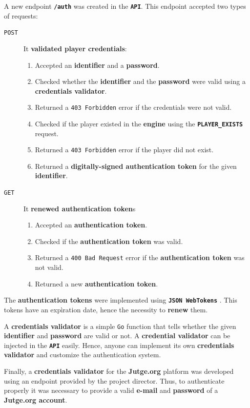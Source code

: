 \documentclass[a4paper,11pt,titlepage,abstract,numbers=noenddot,automark,mnsy,intlimits,rgb,dvipsnames]{report}
\begin{document}
A new endpoint \textbf{\texttt{/auth}} was created in the \textbf{\texttt{API}}. This endpoint accepted two types of requests:
\begin{description}
\item[\texttt{POST}]
It \textbf{validated player credentials}:
\begin{enumerate}
\item
Accepted an \textbf{identifier} and a \textbf{password}.
\item
Checked whether the \textbf{identifier} and the \textbf{password} were valid using a \textbf{credentials validator}.
\item
Returned a \texttt{403 Forbidden} error if the credentials were not valid.
\item
Checked if the player existed in the \textbf{engine} using the \textbf{\texttt{PLAYER\_EXISTS}} request.
\item
Returned a \texttt{403 Forbidden} error if the player did not exist.
\item
Returned a \textbf{digitally-signed authentication token} for the given \textbf{identifier}.
\end{enumerate}
\item[\texttt{GET}]
It \textbf{renewed authentication token}s
\begin{enumerate}
\item
Accepted an \textbf{authentication token}.
\item
Checked if the \textbf{authentication token} was valid.
\item
Returned a \texttt{400 Bad Request} error if the \textbf{authentication token} was not valid.
\item
Returned a new \textbf{authentication token}.
\end{enumerate}
\end{description}
The \textbf{authentication tokens} were implemented using \textbf{\texttt{JSON WebTokens}} \cite{jwt}. This tokens have an expìration date,
hence the necessity to \textbf{renew} them.

A \textbf{credentials validator} is a simple \texttt{Go} function that tells whether the given \textbf{identifier} and
\textbf{password} are valid or not. A \textbf{credential validator} can be injected in the \textbf{\texttt{API}} easily. Hence, anyone can
implement its own \textbf{credentials validator} and customize the authentication system.

Finally, a \textbf{credentials validator} for the \textbf{Jutge.org} platform was developed using an endpoint provided by the project
director. Thus, to authenticate properly it was necessary to provide a valid \textbf{e-mail} and \textbf{password} of a
\textbf{Jutge.org account}.
\end{document}
